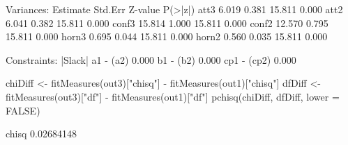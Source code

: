 \begin{Schunk}
\begin{Soutput}
Variances:
                   Estimate  Std.Err  Z-value  P(>|z|)
    att3              6.019    0.381   15.811    0.000
    att2              6.041    0.382   15.811    0.000
    conf3            15.814    1.000   15.811    0.000
    conf2            12.570    0.795   15.811    0.000
    horn3             0.695    0.044   15.811    0.000
    horn2             0.560    0.035   15.811    0.000

Constraints:
                                               |Slack|
    a1 - (a2)                                    0.000
    b1 - (b2)                                    0.000
    cp1 - (cp2)                                  0.000
\end{Soutput}
\begin{Sinput}
 chiDiff <- fitMeasures(out3)["chisq"] -
     fitMeasures(out1)["chisq"]
 dfDiff <- fitMeasures(out3)["df"] -
     fitMeasures(out1)["df"]
 pchisq(chiDiff, dfDiff, lower = FALSE)
\end{Sinput}
\begin{Soutput}
     chisq 
0.02684148 
\end{Soutput}
\end{Schunk}
